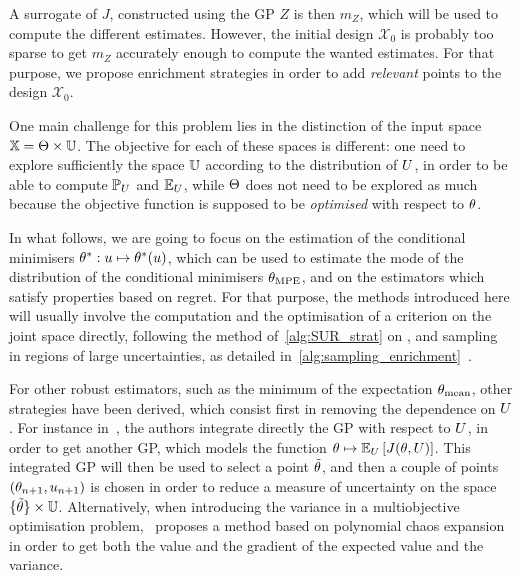 \documentclass[../../Main_ManuscritThese.tex]{subfiles}
\begin{document}
A surrogate of $J$, constructed using the GP $Z$ is then $m_Z$, which
will be used to compute the different estimates. However, the initial
design $\mathcal{X}_0$ is probably too sparse to get $m_Z$ accurately
enough to compute the wanted estimates. For that purpose, we propose
enrichment strategies in order to add \emph{relevant} points to the
design $\mathcal{X}_0$.

One main challenge for this problem lies in the distinction of the
input space $\mathbb{X} = \Theta \times \mathbb{U}$. The objective for each
of these spaces is different: one need to explore sufficiently the
space $\mathbb{U}$ according to the distribution of $U$, in order to be
able to compute $\mathbb{P}_{U}$ and $\mathbb{E}_{U}$, while $\Theta$ does
not need to be explored as much because the objective function is
supposed to be \emph{optimised} with respect to $\theta$.

In what follows, we are going to focus on the estimation of the
conditional minimisers $\theta^*: u\mapsto \theta^*(u)$, which can be
used to estimate the mode of the distribution of the conditional
minimisers ${\theta}_{\mathrm{MPE}}$, and on the estimators which satisfy
properties based on regret.  For that purpose, the methods introduced
here will usually involve the computation and the optimisation of a
criterion on the joint space directly, following the method
of~\cref{alg:SUR_strat} on , and sampling in
regions of large uncertainties, as detailed
in~\cref{alg:sampling_enrichment}~.

For other robust estimators, such as the minimum of the expectation
${\theta}_{\mathrm{mean}}$, other strategies have been derived, which
consist first in removing the dependence on $U$. For instance
in~\cite{janusevskis_simultaneous_2010}, the authors integrate
directly the GP with respect to $U$, in order to get another GP,
which models the function
$\theta\mapsto \mathbb{E}_{U}\left[J(\theta, U)\right]$. This integrated GP
will then be used to select a point $\tilde{\theta}$, and then a couple
of points $(\theta_{n+1},u_{n+1})$ is chosen in order to reduce a
measure of uncertainty on the space $\{\tilde{\theta}\}\times \mathbb{U}$.
Alternatively, when introducing the variance in a multiobjective
optimisation problem,~\cite{miranda_adjoint-based_2016} proposes a
method based on polynomial chaos expansion in order to get both the
value and the gradient of the expected value and the variance.


\end{document}
